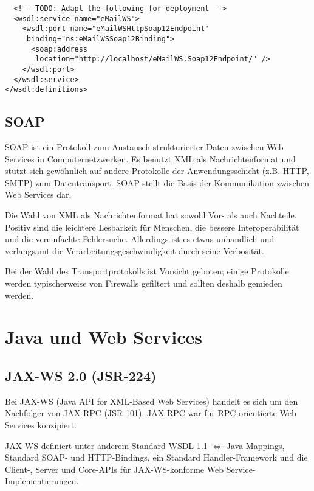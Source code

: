 \documentclass[runningheads]{llncs}
\begin{document}
\begin{verbatim}
  <!-- TODO: Adapt the following for deployment -->
  <wsdl:service name="eMailWS">
    <wsdl:port name="eMailWSHttpSoap12Endpoint"
     binding="ns:eMailWSSoap12Binding">
      <soap:address
       location="http://localhost/eMailWS.Soap12Endpoint/" />
    </wsdl:port>
  </wsdl:service>
</wsdl:definitions>
    \end{verbatim}

  \label{soap}
  \subsection{SOAP}
  \nocite{wk_soap}
    SOAP ist ein Protokoll zum Austausch strukturierter Daten zwischen Web Services in Computernetzwerken. Es benutzt XML als Nachrichtenformat und stützt sich gewöhnlich auf andere Protokolle der Anwendungsschicht (z.B. HTTP, SMTP) zum Datentransport. SOAP stellt die Basis der Kommunikation zwischen Web Services dar.

    Die Wahl von XML als Nachrichtenformat hat sowohl Vor- als auch Nachteile.
    Positiv sind die leichtere Lesbarkeit für Menschen, die bessere Interoperabilität und die vereinfachte Fehlersuche. Allerdings ist es etwas unhandlich und verlangsamt die Verarbeitungsgeschwindigkeit durch seine Verbosität.

    Bei der Wahl des Transportprotokolls ist Vorsicht geboten; einige Protokolle werden typischerweise von Firewalls gefiltert und sollten deshalb gemieden werden.

  \label{wsj}
  \section{Java und Web Services}

  \label{jsr224}
  \subsection{JAX-WS 2.0 (JSR-224)}
    Bei JAX-WS\cite{jsr_224} (Java API for XML-Based Web Services) handelt es sich um den Nachfolger von JAX-RPC (JSR-101). JAX-RPC war für RPC-orientierte Web Services konzipiert.

    JAX-WS definiert unter anderem Standard WSDL 1.1 $\Leftrightarrow$ Java Mappings, Standard SOAP- und HTTP-Bindings, ein Standard Handler-Framework und die Client-, Server und Core-APIs für JAX-WS-konforme Web Service-Im\-ple\-men\-tier\-ung\-en.
\end{document}
